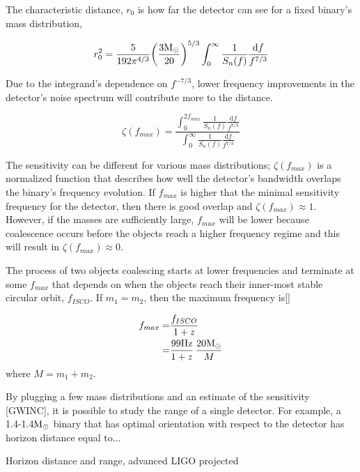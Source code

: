 	The characteristic distance, $r_0$ is how far the detector can see for a fixed binary's mass distribution,
	
	\begin{equation}\label{char_r0}
	r_0^2 = \frac{5}{192\pi^{4/3}} \bigg(\frac{3\textup{M}_\odot}{20}\bigg)^{5/3}   \int_{0}^{\infty} \frac{1}{S_n(f)} \frac{\text{d} f}{f^{7/3}}
	\end{equation}

	Due to the integrand's dependence on $f^{-7/3}$, lower frequency improvements in the detector's noise spectrum will contribute more to the distance.
	
	\begin{equation}\label{zeta}
	\zeta(f_{max}) = \frac{\int_{0}^{2f_{max}} \frac{1}{S_n(f)} \frac{\text{d} f}{f^{7/3}}}{\int_{0}^{\infty} \frac{1}{S_n(f)} \frac{\text{d} f}{f^{7/3}}}
	\end{equation}
	
	The sensitivity can be different for various mass distributions; $\zeta(f_{max})$ is a normalized function that describes how well the detector's bandwidth overlaps the binary's frequency evolution.  If $f_{max}$ is higher that the minimal sensitivity frequency for the detector, then there is good overlap and  $\zeta(f_{max})\approx 1$.  However, if the masses are sufficiently large, $f_{max}$ will be lower because coalescence occurs before the objects reach a higher frequency regime and this will result in  $\zeta(f_{max})\approx 0$.
	
	The process of two objects coalescing starts at lower frequencies and terminate at some $f_{max}$ that depends on when the objects reach their inner-most stable circular orbit, $f_{ISCO}$.   If $m_1=m_2$, then the maximum frequency is[]
	
	\begin{equation}
	\begin{aligned}
	f_{max}	=&  \frac{f_{ISCO}}{1+z} \\
			=&	\frac{99 \text{Hz}}{1+z} \, \frac{20 \textup{M}_\odot}{M}
	\end{aligned}
	\end{equation}
	where $M=m_1+m_2$.
	
	
	By plugging a few mass distributions and an estimate of the sensitivity [GWINC], it is possible to study the range of a single detector.  For example, a 1.4-1.4$\textup{M}_\odot$ binary that has optimal orientation with respect to the detector has horizon distance equal to...
	
	Horizon distance and range, advanced LIGO projected
	
